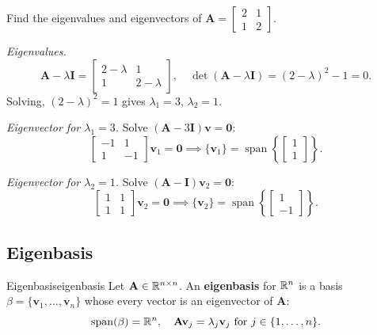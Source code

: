 \begin{example}
  Find the eigenvalues and eigenvectors of $\mathbf{A} =
    \begin{bmatrix}
      2 & 1 \\ 1 & 2
    \end{bmatrix}
  $.

  \medskip

  \emph{Eigenvalues.}
  \[
    \mathbf{A} - \lambda \mathbf{I} =
    \begin{bmatrix}
      2 - \lambda & 1           \\
      1           & 2 - \lambda
    \end{bmatrix}
    ,
    \quad
    \det(\mathbf{A} - \lambda \mathbf{I}) = (2 - \lambda)^2 - 1 = 0.
  \]
  Solving, $(2 - \lambda)^2 = 1$ gives $\lambda_1 = 3$, $\lambda_2 = 1$.

  \medskip

  \emph{Eigenvector for $\lambda_1 = 3$.} Solve $(\mathbf{A} - 3\mathbf{I})\mathbf{v} = \mathbf{0}$:
  \[
    \begin{bmatrix}
      -1 & 1  \\
      1  & -1
    \end{bmatrix}
    \mathbf{v}_1 = \mathbf{0}
    \implies \{\mathbf{v}_1\} = \operatorname{span}\left\{
    \begin{bmatrix}
      1 \\ 1
    \end{bmatrix}
    \right\}
    .
  \]

  \emph{Eigenvector for $\lambda_2 = 1$.} Solve $(\mathbf{A} - \mathbf{I})\mathbf{v}_2 = \mathbf{0}$:
  \[
    \begin{bmatrix}
      1 & 1 \\
      1 & 1
    \end{bmatrix}
    \mathbf{v}_2 = \mathbf{0}
    \implies \{\mathbf{v}_2\} = \operatorname{span}\left\{
    \begin{bmatrix}
      1 \\ -1
    \end{bmatrix}
    \right\}
    .
  \]
\end{example}

\subsection{Eigenbasis}

\begin{definition}{Eigenbasis}{eigenbasis}
  Let $\mathbf{A} \in \mathbb{R}^{n \times n}$. An \textbf{eigenbasis} for $\mathbb{R}^n$ is a basis $\beta = \{\mathbf{v}_1, \ldots, \mathbf{v}_n\}$ whose every vector is an eigenvector of $\mathbf{A}$:
  \[
    \operatorname{span}(\beta) = \mathbb{R}^n,
    \quad
    \mathbf{A}\mathbf{v}_j = \lambda_j \mathbf{v}_j \text{ for } j \in \{1, \ldots, n\}.
  \]
\end{definition}

